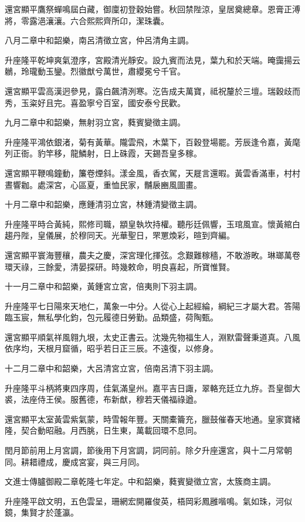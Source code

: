 \begin{pinyinscope}
還宮顯平鷹祭蟬鳴屆白藏，御廩初登穀始嘗。秋回禁陛涼，皇居奠總章。恩膏正溥將，零露浥瀼瀼。六合熙熙齊所卬，潔珠囊。

八月二章中和韶樂，南呂清徵立宮，仲呂清角主調。

升座隆平乾坤爽氣澄序，宮殿清光靜安。設九賓而法見，葉九和於天端。晻靄揚云鶒，玲瓏動玉鑾。烈徽猷兮萬世，肅纓冕兮千官。

還宮顯平雲高漢迥參見，露白飆清洌寒。汔告成夫萬寶，祗祝釐於三壇。瑞穀歧而秀，玉粢好且完。喜盈寧兮百室，國安泰兮民歡。

九月二章中和韶樂，無射羽立宮，蕤賓變徵主調。

升座隆平鴻依銀渚，菊有黃華。隴雲飛，木葉下，百穀登場罷。芳辰逢令嘉，黃麾列正衙。豹竿移，龍鱗射，日上硃霞，天錫吾皇多稼。

還宮顯平鞭鳴鐘動，簾卷煙斜。漾金風，香衣駕，天屣言還暇。黃雲香滿車，村村晝響耞。處深宮，心區夏，重恤民家，黼扆豳風圖畫。

十月二章中和韶樂，應鍾清羽立宮，林鍾清變徵主調。

升座隆平時合黃純，熙修司職，顓皇執坎持權。聽彤廷佩響，玉琯風宣。懷黃綰白趨丹陛，皇儀展，於穆同天。光華聖日，罘罳煥彩，暄到齊編。

還宮顯平寰海豐穰，農夫之慶，深宮理化揮弦。念艱難稼穡，不敢游畋。琳瑯萬卷環天祿，三餘愛，清晏探研。時幾敕命，明良喜起，所寶惟賢。

十一月二章中和韶樂，黃鍾宮立宮，倍夷則下羽主調。

升座隆平七日陽來天地仁，萬象一中分。人從心上起經綸，綱紀三才屬大君。答陽臨玉宸，無私學化鈞，包元履德日勞勤。品類盛，荷陶甄。

還宮顯平順氣祥風翱九垠，太史正書云。沈幾先物福生人，淵默雷聲秉道真。八風依序均，天根月窟循，昭乎若日正三辰。不遠復，以修身。

十二月二章中和韶樂，大呂清宮立宮，倍南呂清下羽主調。

升座隆平斗柄將東四序周，佳氣滿皇州。嘉平吉日諏，翠輅充廷立九斿。吾皇御大裘，法座侍王侯。服舊德，布新猷，穆若天儀福祿遒。

還宮顯平太室黃雲紫氣蒙，時雪報年豐。天關橐籥充，臘鼓催春天地通。皇家寶緒隆，契合動昭融。月西朓，日生東，萬載回環不息同。

閏月節前用上月宮調，節後用下月宮調，詞同前。除夕升座還宮，與十二月常朝同。耕耤禮成，慶成宮宴，與三月同。

文進士傳臚御殿二章乾隆七年定。中和韶樂，蕤賓變徵立宮，太簇商主調。

升座隆平啟文明，五色雲呈，珊網宏開羅俊英，梧岡彩鳳雝喈鳴。氣如珠，河似鏡，集賢才於蓬瀛。


\end{pinyinscope}
